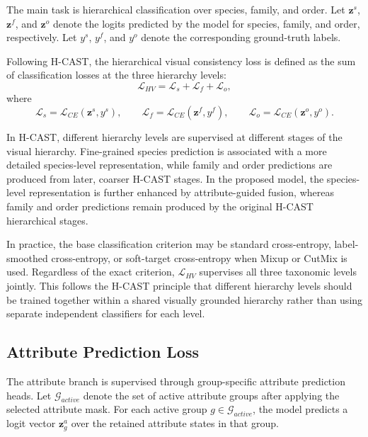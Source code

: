 The main task is hierarchical classification over species, family, and order. Let \(\mathbf{z}^{s}\), \(\mathbf{z}^{f}\), and \(\mathbf{z}^{o}\) denote the logits predicted by the model for species, family, and order, respectively. Let \(y^{s}\), \(y^{f}\), and \(y^{o}\) denote the corresponding ground-truth labels.

Following H-CAST, the hierarchical visual consistency loss is defined as the sum of classification losses at the three hierarchy levels:
\begin{equation}
    \mathcal{L}_{HV}
    =
    \mathcal{L}_{s}
    +
    \mathcal{L}_{f}
    +
    \mathcal{L}_{o},
    \label{eq:hv_loss}
\end{equation}
where
\begin{equation}
    \mathcal{L}_{s}
    =
    \mathcal{L}_{CE}(\mathbf{z}^{s}, y^{s}),
    \qquad
    \mathcal{L}_{f}
    =
    \mathcal{L}_{CE}(\mathbf{z}^{f}, y^{f}),
    \qquad
    \mathcal{L}_{o}
    =
    \mathcal{L}_{CE}(\mathbf{z}^{o}, y^{o}).
\end{equation}

In H-CAST, different hierarchy levels are supervised at different stages of the visual hierarchy. Fine-grained species prediction is associated with a more detailed species-level representation, while family and order predictions are produced from later, coarser H-CAST stages. In the proposed model, the species-level representation is further enhanced by attribute-guided fusion, whereas family and order predictions remain produced by the original H-CAST hierarchical stages.

In practice, the base classification criterion may be standard cross-entropy, label-smoothed cross-entropy, or soft-target cross-entropy when Mixup \cite{zhang2017mixup} or CutMix \cite{yun2019cutmix} is used. Regardless of the exact criterion, \(\mathcal{L}_{HV}\) supervises all three taxonomic levels jointly. This follows the H-CAST principle that different hierarchy levels should be trained together within a shared visually grounded hierarchy rather than using separate independent classifiers for each level.
\subsection{Attribute Prediction Loss}

The attribute branch is supervised through group-specific attribute prediction heads. Let \(\mathcal{G}_{active}\) denote the set of active attribute groups after applying the selected attribute mask. For each active group \(g \in \mathcal{G}_{active}\), the model predicts a logit vector \(\mathbf{z}^{a}_{g}\) over the retained attribute states in that group.

